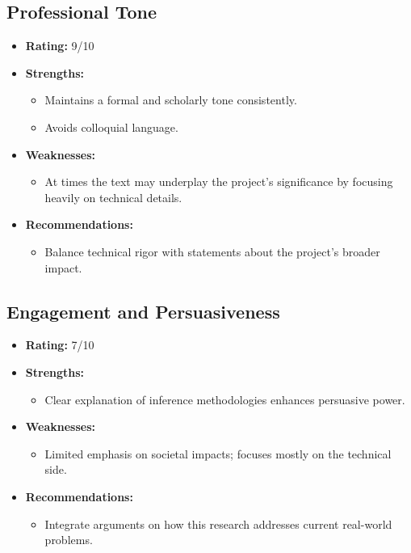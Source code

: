 \documentclass{article}
\begin{document}
\subsection{Professional Tone}
\begin{itemize}
    \item \textbf{Rating:} 9/10
    \item \textbf{Strengths:}
        \begin{itemize}
            \item Maintains a formal and scholarly tone consistently.
            \item Avoids colloquial language.
        \end{itemize}
    \item \textbf{Weaknesses:}
        \begin{itemize}
            \item At times the text may underplay the project’s significance by focusing heavily on technical details.
        \end{itemize}
    \item \textbf{Recommendations:}
        \begin{itemize}
            \item Balance technical rigor with statements about the project's broader impact.
        \end{itemize}
\end{itemize}

\subsection{Engagement and Persuasiveness}
\begin{itemize}
    \item \textbf{Rating:} 7/10
    \item \textbf{Strengths:}
        \begin{itemize}
            \item Clear explanation of inference methodologies enhances persuasive power.
        \end{itemize}
    \item \textbf{Weaknesses:}
        \begin{itemize}
            \item Limited emphasis on societal impacts; focuses mostly on the technical side.
        \end{itemize}
    \item \textbf{Recommendations:}
        \begin{itemize}
            \item Integrate arguments on how this research addresses current real-world problems.
        \end{itemize}
\end{itemize}
\end{document}
